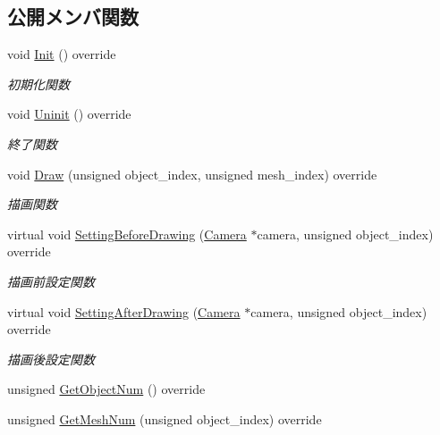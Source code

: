 \subsection*{公開メンバ関数}
\begin{DoxyCompactItemize}
\item 
void \mbox{\hyperlink{class_stencil_shadow_test_draw_a65be72e71cd12cacf315b0364c12c3e3}{Init}} () override
\begin{DoxyCompactList}\small\item\em 初期化関数 \end{DoxyCompactList}\item 
void \mbox{\hyperlink{class_stencil_shadow_test_draw_ad0672bf4ecfc8091cf54ed6f2c76b618}{Uninit}} () override
\begin{DoxyCompactList}\small\item\em 終了関数 \end{DoxyCompactList}\item 
void \mbox{\hyperlink{class_stencil_shadow_test_draw_abb5f9445b7d94c213a3751fa57e36643}{Draw}} (unsigned object\+\_\+index, unsigned mesh\+\_\+index) override
\begin{DoxyCompactList}\small\item\em 描画関数 \end{DoxyCompactList}\item 
virtual void \mbox{\hyperlink{class_stencil_shadow_test_draw_a0f697b6dad67048c7f8916a53cca6b1c}{Setting\+Before\+Drawing}} (\mbox{\hyperlink{class_camera}{Camera}} $\ast$camera, unsigned object\+\_\+index) override
\begin{DoxyCompactList}\small\item\em 描画前設定関数 \end{DoxyCompactList}\item 
virtual void \mbox{\hyperlink{class_stencil_shadow_test_draw_a68917115d3f151ed91ce297924ee5bbb}{Setting\+After\+Drawing}} (\mbox{\hyperlink{class_camera}{Camera}} $\ast$camera, unsigned object\+\_\+index) override
\begin{DoxyCompactList}\small\item\em 描画後設定関数 \end{DoxyCompactList}\item 
unsigned \mbox{\hyperlink{class_stencil_shadow_test_draw_a8cc9a54a2bcb1fd006331fca1add02dc}{Get\+Object\+Num}} () override
\item 
unsigned \mbox{\hyperlink{class_stencil_shadow_test_draw_acfa569f1dcdc3829796138e313f204ad}{Get\+Mesh\+Num}} (unsigned object\+\_\+index) override

\end{DoxyCompactItemize}
